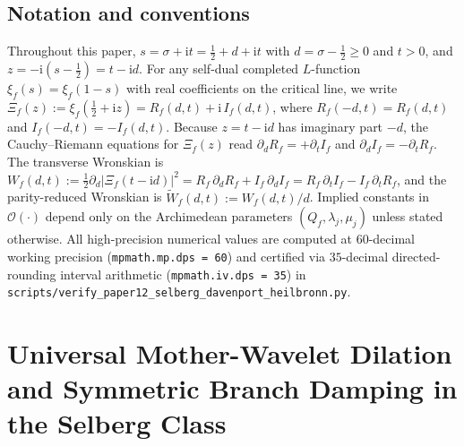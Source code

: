 \documentclass[11pt,reqno]{amsart}
\theoremstyle{definition}
\theoremstyle{remark}
\numberwithin{equation}{section}
\newcommand{\ii}{\mathrm{i}}
\begin{document}
\subsection{Notation and conventions}\label{subsec:notation}

Throughout this paper, $s = \sigma + \ii t = \frac{1}{2} + d + \ii t$ with $d = \sigma - \frac{1}{2} \ge 0$ and $t > 0$, and $z = -\ii(s - \frac{1}{2}) = t - \ii d$. For any self-dual completed $L$-function $\xi_f(s) = \xi_f(1-s)$ with real coefficients on the critical line, we write $\Xi_f(z) := \xi_f(\frac{1}{2}+\ii z) = R_f(d,t) + \ii\,I_f(d,t)$, where $R_f(-d,t) = R_f(d,t)$ and $I_f(-d,t) = -I_f(d,t)$. Because $z = t - \ii d$ has imaginary part $-d$, the Cauchy--Riemann equations for $\Xi_f(z)$ read $\partial_d R_f = +\partial_t I_f$ and $\partial_d I_f = -\partial_t R_f$. The transverse Wronskian is $W_f(d,t) := \frac{1}{2}\partial_d|\Xi_f(t-\ii d)|^2 = R_f\,\partial_d R_f + I_f\,\partial_d I_f = R_f\,\partial_t I_f - I_f\,\partial_t R_f$, and the parity-reduced Wronskian is $\widetilde{W}_f(d,t) := W_f(d,t)/d$. Implied constants in $\mathcal{O}(\cdot)$ depend only on the Archimedean parameters $(Q_f, \lambda_j, \mu_j)$ unless stated otherwise. All high-precision numerical values are computed at $60$-decimal working precision (\texttt{mpmath.mp.dps = 60}) and certified via $35$-decimal directed-rounding interval arithmetic (\texttt{mpmath.iv.dps = 35}) in \texttt{scripts/}\allowbreak\texttt{verify\_paper12\_}\allowbreak\texttt{selberg\_davenport\_}\allowbreak\texttt{heilbronn.py}.

\section{Universal Mother-Wavelet Dilation and Symmetric Branch Damping in the Selberg Class}\label{sec:mother_wavelet}
\end{document}
